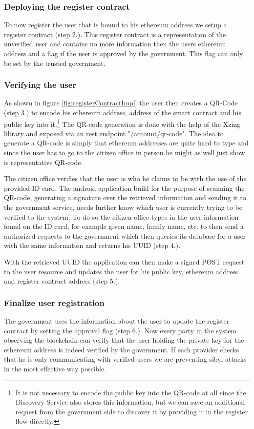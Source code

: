 \subsubsection{Deploying the register contract}
To now register the user that is bound to his ethereum address we setup a register contract (step 2.). This register contract is a representation of the unverified user and contains no more information then the users ethereum address and a flag if the user is approved by the government. This flag can only be set by the trusted government. 

\subsubsection{Verifying the user}
As shown in figure \ref{fig:registerContractImpl} the user then creates a QR-Code (step 3.) to encode his ethereum address, address of the smart contract and his public key into it.\footnote{It is not necessary to encode the public key into the QR-code at all since the Discovery Service also stores this information, but we can save an additional request from the government side to discover it by providing it in the register flow directly.} The QR-code generation is done with the help of the Xzing library and exposed via an rest endpoint "/account/qr-code". The idea to generate a QR-code is simply that ethereum addresses are quite hard to type and since the user has to go to the citizen office in person he might as well just show is representative QR-code. 

The citizen office verifies that the user is who he claims to be with the use of the provided ID card. The android application build for the purpose of scanning the QR-code, generating a signature over the retrieved information and sending it to the government service, needs further know which user is currently trying to be verified to the system. To do so the citizen office types in the user information found on the ID card, for example given name, family name, etc. to then send a authorized requests to the government which then queries its database for a user with the same information and returns his UUID (step 4.). 

With the retrieved UUID the application can then make a signed POST request to the user resource  and updates the user for his public key, ethereum address and register contract address (step 5.).

\subsubsection{Finalize user registration}
The government uses the information about the user to update the register contract by setting the approval flag (step 6.). Now every party in the system observing the blockchain can verify that the user holding the private key for the ethereum address is indeed verified by the government. If each provider checks that he is only communicating with verified users we are preventing sibyl attacks in the most effective way possible. 

